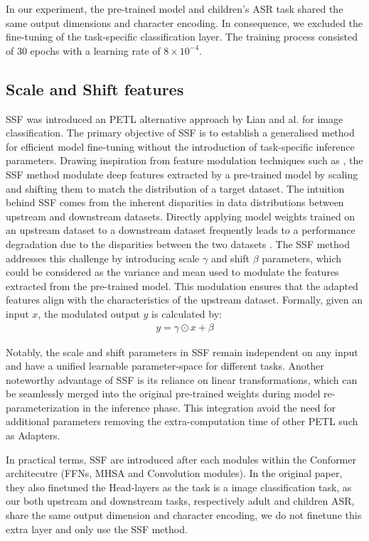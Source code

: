 In our experiment, the pre-trained model and children's \ac{ASR} task shared the same output dimensions and character encoding. In consequence, we excluded the fine-tuning of the task-specific classification layer. The training process consisted of 30 epochs with a learning rate of $8 \times 10^{-4}$.

\subsection{Scale and Shift features}
\ac{SSF} was introduced an \ac{PETL} alternative approach by Lian and al. \cite{lian2022scaling} for image classification. The primary objective of SSF is to establish a generalised method for efficient model fine-tuning without the introduction of task-specific inference parameters. Drawing inspiration from feature modulation techniques such as \cite{wu2018group,huang2017arbitrary}, the \ac{SSF} method modulate deep features extracted by a pre-trained model by scaling and shifting them to match the distribution of a target dataset. 
The intuition behind \ac{SSF} comes from the inherent disparities in data distributions between upstream and downstream datasets. Directly applying model weights trained on an upstream dataset to a downstream dataset frequently leads to a performance degradation due to the disparities between the two datasets \cite{sun2016return}. The \ac{SSF} method addresses this challenge by introducing scale $\gamma$ and shift $\beta$ parameters, which could be considered as the variance and mean used to modulate the features extracted from the pre-trained model. This modulation ensures that the adapted features align with the characteristics of the upstream dataset. Formally, given an input $x$, the modulated output $y$ is calculated by:
\begin{align}
    y = \gamma \odot x + \beta
\end{align}

Notably, the scale and shift parameters in \ac{SSF} remain independent on any input and have a unified learnable parameter-space for different tasks. Another noteworthy advantage of \ac{SSF} is its reliance on linear transformations, which can be seamlessly merged into the original pre-trained weights during model re-parameterization in the inference phase. This integration avoid the need for additional parameters removing the extra-computation time of other \ac{PETL} such as Adapters.

In practical terms, \ac{SSF} are introduced after each modules within the Conformer architecutre (\acp{FFN}, \ac{MHSA} and Convolution modules). In the original paper, they also finetuned the Head-layers as the task is a image classification task, as our both upstream and downstream tasks, respectively adult and children \ac{ASR}, share the same output dimension and character encoding, we do not finetune this extra layer and only use the \ac{SSF} method. 

